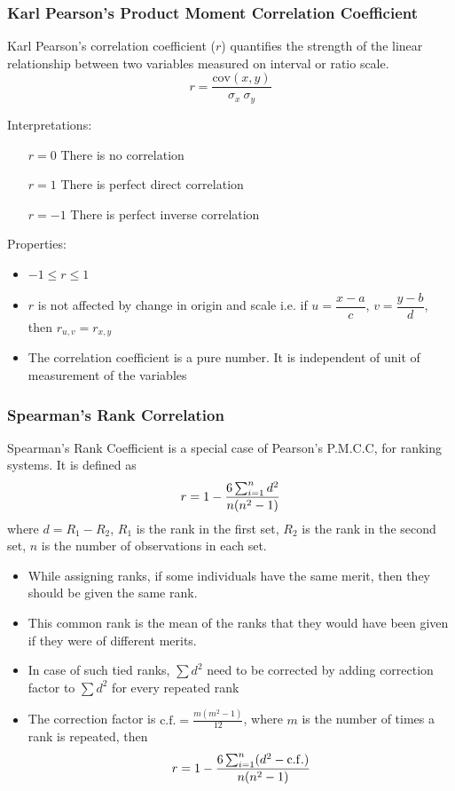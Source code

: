 \documentclass[
10pt, %
a4paper, %
]{report}
\begin{document}
\subsubsection*{Karl Pearson's Product Moment Correlation Coefficient}

Karl Pearson’s correlation coefficient (\(r\)) quantifies the strength of the linear relationship between two variables measured on interval or ratio scale.
\[
r = \frac{\mathrm{cov}(x, y)}{\sigma_x \ \sigma_y}
\]

Interpretations:
\begin{itemize}
\item[\(r=0\)] There is no correlation
\item[\(r=1\)] There is perfect direct correlation
\item[\(r=-1\)] There is perfect inverse correlation
\end{itemize}

Properties:
\begin{itemize}
\item \(-1 \le r \le 1\)
\item \(r\) is not affected by change in origin and scale i.e. if \(u =\dfrac{x-a}{c}\), \(v = \dfrac{y-b}{d}\), then \(r_{u, v} = r_{x, y}\)
\item The correlation coefficient is a pure number. It is independent of unit of measurement of the variables
\end{itemize}

\subsubsection*{Spearman's Rank Correlation}

Spearman's Rank Coefficient is a special case of Pearson's P.M.C.C, for ranking systems. It is defined as
\[
r = 1 - \frac{6\sum_{i=1}^{n}d^2}{n(n^2-1)}
\]
where
\(d = R_1-R_2\),
\(R_1\) is the rank in the first set,
\(R_2\) is the rank in the second set,
\(n\) is the number of observations in each set.

\begin{itemize}
\item While assigning ranks, if some individuals have the same merit, then they should be given the same rank.
\item This common rank is the mean of the ranks that they would have been given if they were of different merits.
\item In case of such tied ranks, \(\sum d^2\) need to be corrected by adding correction factor to \(\sum d^2\) for every repeated rank
\item The correction factor is \(\mathrm{c.f.} = \frac{m(m^2-1)}{12}\), where \(m\) is the number of times a rank is repeated, then
\[
r = 1 - \frac{6\sum_{i=1}^{n}(d^2-\mathrm{c.f.})}{n(n^2-1)}
\]
\end{itemize}
\end{document}
